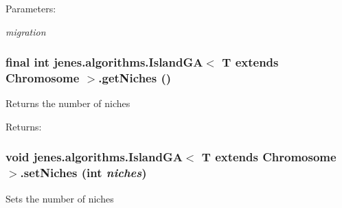 \begin{Desc}
\item[Parameters:]
\begin{description}
\item[{\em migration}]\end{description}
\end{Desc}
\hypertarget{classjenes_1_1algorithms_1_1_island_g_a_3_01_t_01extends_01_chromosome_01_4_5642fdd072cd93a61d7ef3f1b5a806ad}{
\subsubsection[getNiches]{\setlength{\rightskip}{0pt plus 5cm}final int jenes.algorithms.IslandGA$<$ T extends Chromosome $>$.getNiches ()}}
\label{classjenes_1_1algorithms_1_1_island_g_a_3_01_t_01extends_01_chromosome_01_4_5642fdd072cd93a61d7ef3f1b5a806ad}


Returns the number of niches

\begin{Desc}
\item[Returns:]\end{Desc}
\hypertarget{classjenes_1_1algorithms_1_1_island_g_a_3_01_t_01extends_01_chromosome_01_4_5ad013b697d423948678c584adde46f7}{
\subsubsection[setNiches]{\setlength{\rightskip}{0pt plus 5cm}void jenes.algorithms.IslandGA$<$ T extends Chromosome $>$.setNiches (int {\em niches})}}
\label{classjenes_1_1algorithms_1_1_island_g_a_3_01_t_01extends_01_chromosome_01_4_5ad013b697d423948678c584adde46f7}


Sets the number of niches


